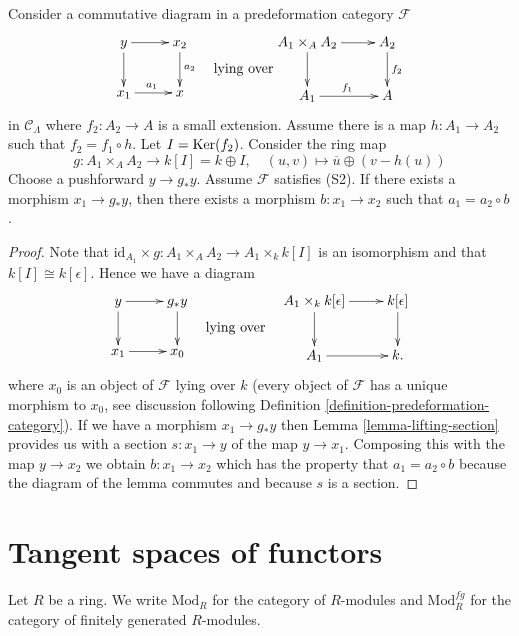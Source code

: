 \begin{lemma}
\label{lemma-lifting-along-small-extension}
Consider a commutative diagram in a predeformation category $\mathcal{F}$
$$
\vcenter{
\xymatrix{
y \ar[r] \ar[d] & x_2 \ar[d]^{a_2} \\
x_1 \ar[r]^{a_1}        & x
}
}
\quad\text{lying over}
\vcenter{
\xymatrix{
A_1 \times_A A_2 \ar[r] \ar[d] & A_2 \ar[d]^{f_2} \\
A_1 \ar[r]^{f_1} & A
}
}
$$
in $\mathcal{C}_\Lambda$ where
$f_2 : A_2 \to A$ is a small extension.
Assume there is a map $h : A_1 \to A_2$ such that $f_2 = f_1 \circ h$.
Let $I = \mathop{\mathrm{Ker}}(f_2)$. Consider the ring map
$$
g : A_1 \times_A A_2 \longrightarrow k[I] = k \oplus I, \quad
(u, v) \longmapsto \overline{u} \oplus (v - h(u))
$$
Choose a pushforward $y \to g_*y$. Assume $\mathcal{F}$ satisfies (S2).
If there exists a morphism $x_1 \to g_*y$, then there exists a
morphism $b: x_1 \to x_2$ such that $a_1 =  a_2 \circ b$.
\end{lemma}

\begin{proof}
Note that
$\text{id}_{A_1} \times g : A_1 \times_A A_2 \to A_1 \times_k k[I]$
is an isomorphism and that $k[I] \cong k[\epsilon]$. Hence we have a diagram
$$
\vcenter{
\xymatrix{
y \ar[r] \ar[d] & g_*y \ar[d] \\
x_1 \ar[r]        & x_0
}
}
\quad\text{lying over}\quad
\vcenter{
\xymatrix{
A_1 \times_k k[\epsilon] \ar[r] \ar[d] & k[\epsilon] \ar[d] \\
A_1 \ar[r] & k.
}
}
$$
where $x_0$ is an object of $\mathcal{F}$ lying over $k$ (every object
of $\mathcal{F}$ has a unique morphism to $x_0$, see
discussion following Definition \ref{definition-predeformation-category}).
If we have a morphism $x_1 \to g_*y$ then
Lemma \ref{lemma-lifting-section}
provides us with a section $s : x_1 \to y$ of the map $y \to x_1$.
Composing this with the map $y \to x_2$ we obtain $b : x_1 \to x_2$
which has the property that $a_1 =  a_2 \circ b$ because
the diagram of the lemma commutes and because $s$ is a section.
\end{proof}





\section{Tangent spaces of functors}
\label{section-tangent-spaces-functors}

\noindent
Let $R$ be a ring. We write $\text{Mod}_R$ for the category of
$R$-modules and $\text{Mod}^{fg}_R$ for the category of finitely
generated $R$-modules.


